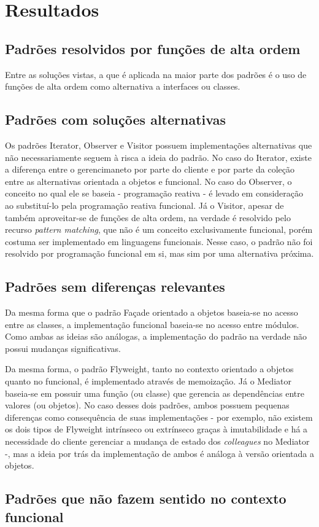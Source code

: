 \chapter{Resultados}

\section{Padrões resolvidos por funções de alta ordem}

Entre as soluções vistas, a que é aplicada na 
maior parte dos padrões é o uso de funções de alta 
ordem como alternativa a interfaces ou classes. 


\section{Padrões com soluções alternativas}

Os padrões Iterator, Observer e Visitor possuem 
implementações alternativas que não necessariamente 
seguem à risca a ideia do padrão. No caso do Iterator, 
existe a diferença entre o gerencimaneto por parte 
do cliente e por parte da coleção entre as 
alternativas orientada a objetos e funcional. No 
caso do Observer, o conceito no qual ele se 
baseia - programação reativa - é levado em 
consideração ao substituí-lo pela programação 
reativa funcional. Já o Visitor, apesar de também 
aproveitar-se de funções de alta ordem, na verdade 
é resolvido pelo recurso \textit{pattern matching}, 
que não é um conceito exclusivamente funcional, 
porém costuma ser implementado em linguagens 
funcionais. Nesse caso, o padrão não foi 
resolvido por programação funcional em si, 
mas sim por uma alternativa próxima. 

\section{Padrões sem diferenças relevantes}

Da mesma forma que o padrão Façade orientado 
a objetos baseia-se no acesso entre as classes, 
a implementação funcional baseia-se no acesso 
entre módulos. Como ambas as ideias são 
análogas, a implementação do padrão na verdade 
não possui mudanças significativas. 

Da mesma forma, o padrão Flyweight, tanto no 
contexto orientado a objetos quanto no funcional, 
é implementado através de memoização. Já o Mediator 
baseia-se em possuir uma função (ou classe) que 
gerencia as dependências entre valores (ou objetos). 
No caso desses dois padrões, ambos possuem 
pequenas diferenças como consequência de suas 
implementações - por exemplo, não existem os dois 
tipos de Flyweight intrínseco ou extrínseco 
graças à imutabilidade e há a necessidade do 
cliente gerenciar a mudança de estado dos 
\textit{colleagues} no Mediator -, mas a ideia 
por trás da implementação de ambos é análoga 
à versão orientada a objetos.

\section{Padrões que não fazem sentido no contexto funcional}


